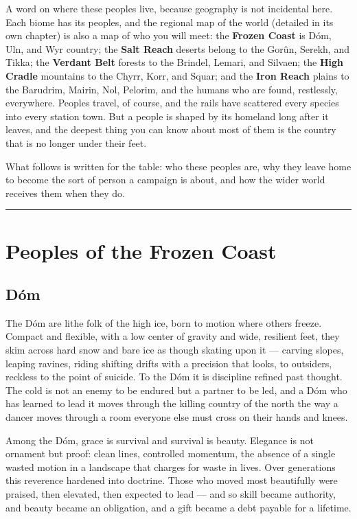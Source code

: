 A word on where these peoples live, because geography is not incidental here. Each biome has its peoples, and the regional map of the world (detailed in its own chapter) is also a map of who you will meet: the \textbf{Frozen Coast} is Dóm, Uln, and Wyr country; the \textbf{Salt Reach} deserts belong to the Gorûn, Serekh, and Tikka; the \textbf{Verdant Belt} forests to the Brindel, Lemari, and Silvaen; the \textbf{High Cradle} mountains to the Chyrr, Korr, and Squar; and the \textbf{Iron Reach} plains to the Barudrim, Mairin, Nol, Pelorim, and the humans who are found, restlessly, everywhere. Peoples travel, of course, and the rails have scattered every species into every station town. But a people is shaped by its homeland long after it leaves, and the deepest thing you can know about most of them is the country that is no longer under their feet.

What follows is written for the table: who these peoples are, why they leave home to become the sort of person a campaign is about, and how the wider world receives them when they do.

\bigskip
\hrule
\bigskip

\section{Peoples of the Frozen Coast}

\subsection{Dóm}

The Dóm are lithe folk of the high ice, born to motion where others freeze. Compact and flexible, with a low center of gravity and wide, resilient feet, they skim across hard snow and bare ice as though skating upon it --- carving slopes, leaping ravines, riding shifting drifts with a precision that looks, to outsiders, reckless to the point of suicide. To the Dóm it is discipline refined past thought. The cold is not an enemy to be endured but a partner to be led, and a Dóm who has learned to lead it moves through the killing country of the north the way a dancer moves through a room everyone else must cross on their hands and knees.

Among the Dóm, grace is survival and survival is beauty. Elegance is not ornament but proof: clean lines, controlled momentum, the absence of a single wasted motion in a landscape that charges for waste in lives. Over generations this reverence hardened into doctrine. Those who moved most beautifully were praised, then elevated, then expected to lead --- and so skill became authority, and beauty became an obligation, and a gift became a debt payable for a lifetime.

